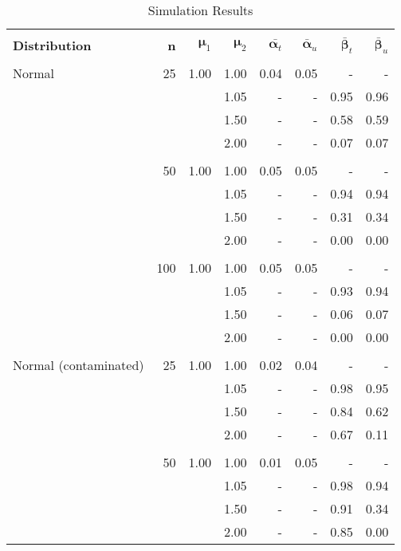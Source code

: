 \documentclass{report}
\begin{document}
\begin{table}[h!]
	\centering
	\caption{Simulation Results}
	\vspace{1em}
	\begin{threeparttable}
		\begin{tabular}{|l r r r r r r r|}
			\hline
			& & & & & & & \\
			\textbf{Distribution} & 
			\textbf{n} & 
			$\bm{\mu}_1$ &
			$\bm{\mu}_2$ &
			$\bar{\bm{\alpha}_t}$ & 
			$\bar{\bm{\alpha}}_u$ & 
			$\bar{\bm{\beta}}_t$ &
			$\bar{\bm{\beta}}_u$ \\

			& & & & & & & \\

			Normal &  25 & 1.00 & 1.00 & 0.04 & 0.05 & - & - \\ 
			&  & & 1.05 & - & - & 0.95 & 0.96 \\ 
			&  & & 1.50 & - & - & 0.58 & 0.59 \\ 
			&  & & 2.00 & - & - & 0.07 & 0.07 \\ 
			& & & & & & & \\
			&  50 & 1.00 & 1.00 & 0.05 & 0.05 & - & - \\ 
			&  & & 1.05 & - & - & 0.94 & 0.94 \\ 
			&  & & 1.50 & - & - & 0.31 & 0.34 \\ 
			&  & & 2.00 & - & - & 0.00 & 0.00 \\ 
			& & & & & & & \\
			& 100 & 1.00 & 1.00 & 0.05 & 0.05 & - & - \\ 
			& & & 1.05 & - & - & 0.93 & 0.94 \\ 
			& & & 1.50 & - & - & 0.06 & 0.07 \\ 
			& & & 2.00 & - & - & 0.00 & 0.00 \\ 
			& & & & & & & \\
			Normal (contaminated) &  25 & 1.00 & 1.00 & 0.02 & 0.04
			& - & - \\ 
			&   & & 1.05 & - & - & 0.98 & 0.95 \\ 
			&   & & 1.50 & - & - & 0.84 & 0.62 \\ 
			&   & & 2.00 & - & - & 0.67 & 0.11 \\ 
			& & & & & & & \\
			&  50 & 1.00 & 1.00 & 0.01 & 0.05 & - & - \\ 
			&   & & 1.05 & - & - & 0.98 & 0.94 \\ 
			&   & & 1.50 & - & - & 0.91 & 0.34 \\ 
			&   & & 2.00 & - & - & 0.85 & 0.00 \\ 

\end{tabular}
\end{threeparttable}
\end{table}
\end{document}
